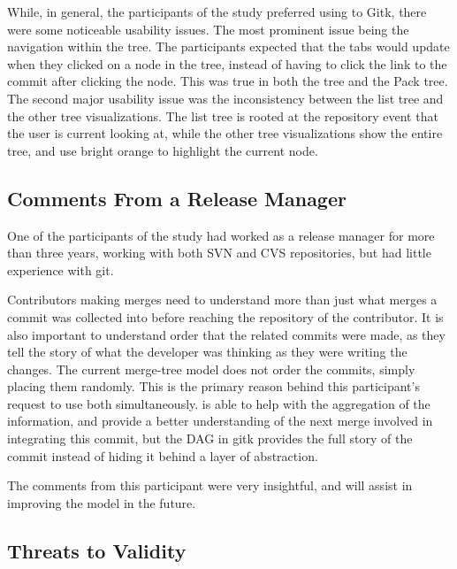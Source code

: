 While, in general, the participants of the study preferred using \tool
to Gitk, there were some noticeable usability issues. The most prominent
issue being the navigation within the tree. The participants expected
that the tabs would update when they clicked on a node in the tree,
instead of having to click the link to the commit after clicking the
node. This was true in both the \rt tree and the Pack tree. The second
major usability issue was the inconsistency between the list tree and
the other tree visualizations. The list tree is rooted at the repository
event that the user is current looking at, while the other tree
visualizations show the entire tree, and use bright orange to highlight
the current node.


\subsection{Comments From a Release Manager}
\label{sub:comments_from_a_release_manager}

One of the participants of the study had worked as a release manager for
more than three years, working with both SVN and CVS repositories, but
had little experience with git.

Contributors making merges need to understand more than just what merges
a commit was collected into before reaching the repository of the
contributor. It is also important to understand order that the related
commits were made, as they tell the story of what the developer was
thinking as they were writing the changes. The current merge-tree model
does not order the commits, simply placing them randomly. This is the
primary reason behind this participant's request to use both
simultaneously. \tool is able to help with the aggregation of the
information, and provide a better understanding of the next merge
involved in integrating this commit, but the DAG in gitk provides the
full story of the commit instead of hiding it behind a layer of
abstraction.

The comments from this participant were very insightful, and will assist
in improving the model in the future.

\subsection{Threats to Validity}
\label{sub:threats}



